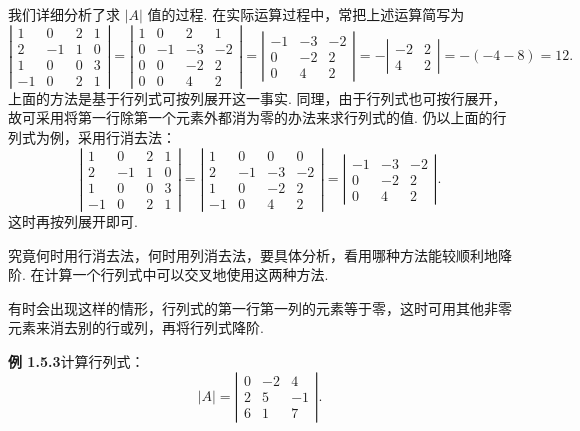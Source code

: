 \documentclass[UTF8, 12pt, fontset=fandol, oneside]{ctexart}
\begin{document}
我们详细分析了求 $|A|$ 值的过程. 在实际运算过程中，常把上述运算简写为
\[
\left|\begin{array}{rrrr}
1 & 0 & 2 & 1\\
2 & -1 & 1 & 0\\
1 & 0 & 0 & 3\\
-1 & 0 & 2 & 1
\end{array}\right|
=
\left|\begin{array}{rrrr}
1 & 0 & 2 & 1\\
0 & -1 & -3 & -2\\
0 & 0 & -2 & 2\\
0 & 0 & 4 & 2
\end{array}\right|
=
\left|\begin{array}{rrr}
-1 & -3 & -2\\
0 & -2 & 2\\
0 & 4 & 2
\end{array}\right|
=-
\left|\begin{array}{rr}
-2 & 2\\
4 & 2
\end{array}\right|
=-(-4-8)=12.
\]
上面的方法是基于行列式可按列展开这一事实. 同理，由于行列式也可按行展开，故可采用将第一行除第一个元素外都消为零的办法来求行列式的值. 仍以上面的行列式为例，采用行消去法：
\[
\left|\begin{array}{rrrr}
1 & 0 & 2 & 1\\
2 & -1 & 1 & 0\\
1 & 0 & 0 & 3\\
-1 & 0 & 2 & 1
\end{array}\right|
=
\left|\begin{array}{rrrr}
1 & 0 & 0 & 0\\
2 & -1 & -3 & -2\\
1 & 0 & -2 & 2\\
-1 & 0 & 4 & 2
\end{array}\right|
=
\left|\begin{array}{rrr}
-1 & -3 & -2\\
0 & -2 & 2\\
0 & 4 & 2
\end{array}\right|.
\]
这时再按列展开即可.

究竟何时用行消去法，何时用列消去法，要具体分析，看用哪种方法能较顺利地降阶. 在计算一个行列式中可以交叉地使用这两种方法.

有时会出现这样的情形，行列式的第一行第一列的元素等于零，这时可用其他非零元素来消去别的行或列，再将行列式降阶.

\noindent\textbf{例 1.5.3}\quad 计算行列式：
\[
|A|=\left|\begin{array}{rrr}
0 & -2 & 4\\
2 & 5 & -1\\
6 & 1 & 7
\end{array}\right|.
\]
\end{document}
